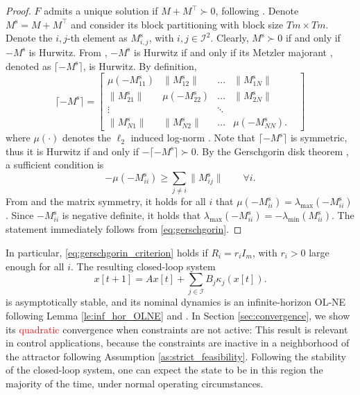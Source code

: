 \documentclass[letterpaper, 10 pt, conference]{ieeeconf}  %
\newcommand{\mc}{\mathcal}
\newcommand{\red}[1]{\textcolor{red}{#1}}
\newcommand{\Ms}{M^{\mathrm{s}}}
\begin{document}
\begin{proof}
$F$ admits a unique solution if $M+M^{\top}\succ 0$, following \cite[Proposition 2.3.2]{facchinei_finite-dimensional_2007}. Denote $\Ms = M + M^{\top}$ and consider its block partitioning with block size $Tm\times Tm$. Denote the $i,j$-th element as $\Ms_{i,j}$, with $i,j\in\mc I^2$. Clearly, $\Ms\succ 0$ if and only if $-\Ms$ is Hurwitz. From \cite[Corollary 2.34]{bullo_contraction_2024}, $-\Ms$ is Hurwitz if and only if its Metzler majorant \cite[\S 2.2]{bullo_contraction_2024}, denoted as $\lceil -\Ms \rceil$, is Hurwitz. By definition, 
\begin{equation}
    \lceil -\Ms \rceil = \begin{bmatrix} \mu(-\Ms_{11}) & \|\Ms_{12}\| & ... & \|\Ms_{1N}\| \\
        \|\Ms_{21}\| & \mu(-\Ms_{22}) & ... & \|\Ms_{2N}\| \\
        \vdots &  & \ddots & & \\
        \|\Ms_{N1}\| & \|\Ms_{N2}\| & ... & \mu(-\Ms_{NN}).
    \end{bmatrix}
\end{equation}
where $\mu(\cdot)$ denotes the $\ell_2$ induced log-norm \cite[Eq. 2.23]{bullo_contraction_2024}. Note that $\lceil -\Ms \rceil$ is symmetric, thus it is Hurwitz if and only if $-\lceil -\Ms \rceil\succ 0$. By the Gerschgorin disk theorem \cite[Theorem 2.8]{bullo_lectures_2024}, a sufficient condition is
\begin{equation} \label{eq:gerschgorin}
	-\mu(-\Ms_{ii}) \geq \sum_{j\neq i} \|\Ms_{ij}\| \qquad \forall i.
\end{equation}
From \cite[Example 2.25]{bullo_contraction_2024} and the matrix symmetry, it holds for all $i$ that $\mu(-\Ms_{ii}) = \lambda_{\text{max}}(-\Ms_{ii})$. Since $-\Ms_{ii}$ is negative definite, it holds that $\lambda_{\text{max}}(-\Ms_{ii}) = -\lambda_{\text{min}}(\Ms_{ii}) $. The statement immediately follows from \eqref{eq:gerschgorin}.
\end{proof}
In particular, \eqref{eq:gerschgorin_criterion} holds if $R_i=r_iI_m$, with $r_i>0$ large enough for all $i$. The resulting closed-loop system 
\begin{equation}\label{eq:closed_loop_dyn}
    x[t+1] = Ax[t] + \sum_{j\in\mc I} B_j \kappa_j(x[t]).
\end{equation}
is asymptotically stable, and its nominal dynamics is an infinite-horizon OL-NE following Lemma \ref{le:inf_hor_OLNE} and \cite[Lemma 2]{benenati2024linear}. 
\fi
 In Section \ref{sec:convergence}, we show its \red{quadratic} convergence when constraints are not active: This result is relevant in control applications, because the constraints are inactive in a neighborhood of the attractor following Assumption \ref{as:strict_feasibility}. Following the stability of the closed-loop system, one can expect the state to be in this region the majority of the time, under normal operating circumstances.
\end{document}
